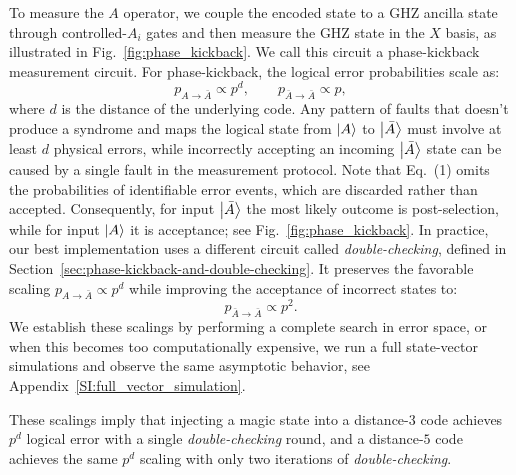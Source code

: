\documentclass[twocolumn,notitlepage,nofootinbib,floatfix,superscriptaddress]{revtex4-1}
\begin{document}
To measure the $A$ operator, we couple the encoded state to a GHZ ancilla state through controlled-$A_i$ gates and then measure the GHZ state in the $X$ basis, as illustrated in Fig.~\ref{fig:phase_kickback}. We call this circuit  a phase-kickback measurement circuit. For phase-kickback, the logical error probabilities scale as:
\begin{equation}
\label{eq:logical_scaling_phase_kickback}
    p_{A \to \bar{A}} \propto p^{d}, \qquad
    p_{\bar{A} \to \bar{A}} \propto p,
\end{equation}
where $d$ is the distance of the underlying code. Any pattern of faults that doesn't produce a syndrome and maps the logical state from $\ket{A}$ to $\ket{\bar{A}}$ must involve at least $d$ physical errors, while incorrectly accepting an incoming $\ket{\bar{A}}$ state can be caused by a single fault in the measurement protocol.
Note that Eq.~(1) omits the probabilities of identifiable error events, which are discarded rather than accepted. Consequently, for input \(\ket{\bar A}\) the most likely outcome is post-selection, while for input \(\ket{A}\) it is acceptance; see Fig.~\ref{fig:phase_kickback}.
In practice, our best implementation uses a different circuit called \emph{double-checking}, defined in Section~\ref{sec:phase-kickback-and-double-checking}. It preserves the favorable scaling $p_{A \to \bar{A}} \propto p^{d}$ while improving the acceptance of incorrect states to:
\begin{equation}
\label{eq:logical_scaling_double_checking}
    p_{\bar{A} \to \bar{A}} \propto p^{2}.
\end{equation}
We establish these scalings by performing a complete search in error space, or when this becomes too computationally expensive, we run a full state-vector simulations and observe the same asymptotic behavior, see Appendix~\ref{SI:full_vector_simulation}.

These scalings imply that injecting a magic state into a distance-$3$ code achieves $p^d$ logical error with a single \textit{double-checking} round, and a distance-$5$ code achieves the same $p^d$ scaling with only two iterations of \textit{double-checking}.
\end{document}
